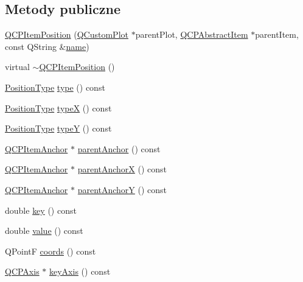 \subsection*{Metody publiczne}
\begin{DoxyCompactItemize}
\item 
\hyperlink{class_q_c_p_item_position_a6519a552bd9766354644ec24d1f26622}{Q\+C\+P\+Item\+Position} (\hyperlink{class_q_custom_plot}{Q\+Custom\+Plot} $\ast$parent\+Plot, \hyperlink{class_q_c_p_abstract_item}{Q\+C\+P\+Abstract\+Item} $\ast$parent\+Item, const Q\+String \&\hyperlink{class_q_c_p_item_anchor_ac93984042a58c875e76847dc3e5f75fe}{name})
\item 
virtual \hyperlink{class_q_c_p_item_position_ad8a289016f7a62332f9c865c39ab2047}{$\sim$\+Q\+C\+P\+Item\+Position} ()
\item 
\hyperlink{class_q_c_p_item_position_aad9936c22bf43e3d358552f6e86dbdc8}{Position\+Type} \hyperlink{class_q_c_p_item_position_aecb709d72c9aa334a7f62e2c9e0b5d60}{type} () const 
\item 
\hyperlink{class_q_c_p_item_position_aad9936c22bf43e3d358552f6e86dbdc8}{Position\+Type} \hyperlink{class_q_c_p_item_position_a3cb68cf9c95be05c66a0f47448e328e5}{typeX} () const 
\item 
\hyperlink{class_q_c_p_item_position_aad9936c22bf43e3d358552f6e86dbdc8}{Position\+Type} \hyperlink{class_q_c_p_item_position_a8a2fec9dec1ce006a598b32685fd7ab3}{typeY} () const 
\item 
\hyperlink{class_q_c_p_item_anchor}{Q\+C\+P\+Item\+Anchor} $\ast$ \hyperlink{class_q_c_p_item_position_a7b4ffab9946945c0e11cd2352dc2e042}{parent\+Anchor} () const 
\item 
\hyperlink{class_q_c_p_item_anchor}{Q\+C\+P\+Item\+Anchor} $\ast$ \hyperlink{class_q_c_p_item_position_a485abba71c8552086c5f68e95dca7f9a}{parent\+AnchorX} () const 
\item 
\hyperlink{class_q_c_p_item_anchor}{Q\+C\+P\+Item\+Anchor} $\ast$ \hyperlink{class_q_c_p_item_position_a1502dba801cb20424b7e097399e372de}{parent\+AnchorY} () const 
\item 
double \hyperlink{class_q_c_p_item_position_ac3cb2bddf5f89e5181830be30b93d090}{key} () const 
\item 
double \hyperlink{class_q_c_p_item_position_a6817f7356d3a2b63e8446c6b6106dae1}{value} () const 
\item 
Q\+PointF \hyperlink{class_q_c_p_item_position_a253d7adbb6d46299bd6cbc31aa8819f1}{coords} () const 
\item 
\hyperlink{class_q_c_p_axis}{Q\+C\+P\+Axis} $\ast$ \hyperlink{class_q_c_p_item_position_ab99de7ae5766d246defb2de9f47eaf51}{key\+Axis} () const 

\end{DoxyCompactItemize}
